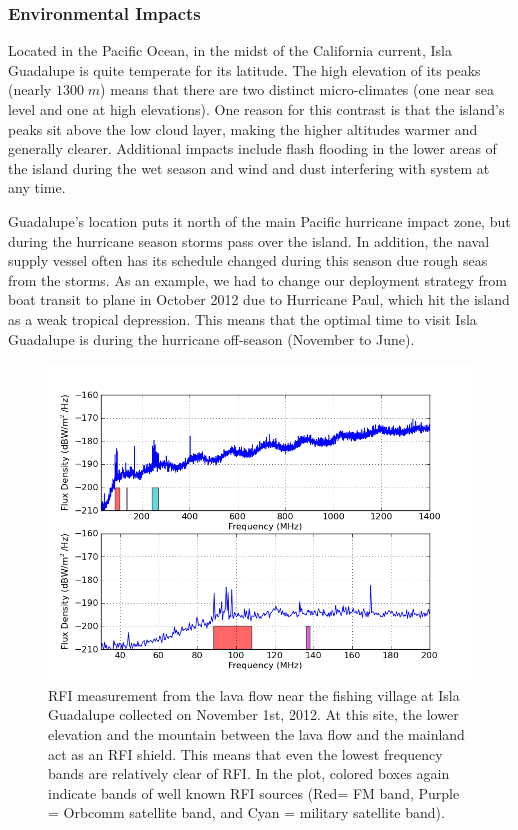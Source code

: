\subsubsection{Environmental Impacts}

Located in the Pacific Ocean, in the midst of the California current, Isla Guadalupe is quite temperate for its latitude. The high elevation of its peaks (nearly $1300 \; m$) means that there are two distinct micro-climates (one near sea level and one at high elevations). One reason for this contrast is that the island's peaks sit above the low cloud layer, making the higher altitudes warmer and generally clearer. Additional impacts include flash flooding in the lower areas of the island during the wet season and wind and dust interfering with system at any time. 

Guadalupe's location puts it north of the main Pacific hurricane impact zone, but during the hurricane season storms pass over the island. In addition, the naval supply vessel often has its schedule changed during this season due rough seas from the storms. As an example, we had to change our deployment strategy from boat transit to plane in October 2012 due to Hurricane Paul, which hit the island as a weak tropical depression. This means that the optimal time to visit Isla Guadalupe is during the hurricane off-season (November to June). 


\begin{figure}[htb]
\begin{center}
\includegraphics[width=0.9\linewidth]{RFI_testing/figures/GI_2__bands.png}
\caption{RFI measurement from the lava flow near the fishing village at Isla Guadalupe collected on November 1st, 2012. At this site, the lower elevation and the mountain between the lava flow and the mainland act as an RFI shield. This means that even the lowest frequency bands are relatively clear of RFI. In the plot, colored boxes again indicate bands of well known RFI sources (Red= FM band, Purple = Orbcomm satellite band, and Cyan = military satellite band).}
\label{Fig:guadlow}
\end{center}
\end{figure}

